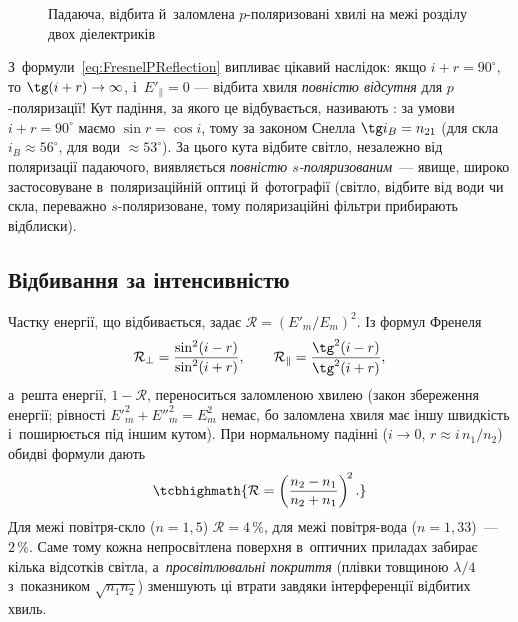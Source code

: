 \begin{figure}\centering
	\caption{Падаюча, відбита й~заломлена $p$-поляризовані хвилі на межі розділу двох
		діелектриків\label{pic:PPolarization}}
\end{figure}

\begin{Attention}[unbreakable]
	З~формули~\eqref{eq:FresnelPReflection} випливає цікавий наслідок: якщо $i+r=90^\circ$, то $\tg(i+r)\to\infty$, і~$E'_\parallel=0$ ---
	відбита хвиля \emph{повністю відсутня} для $p$-поляризації! Кут падіння, за якого це відбувається, називають : за умови $i+r=90^\circ$ маємо $\sin r=\cos i$, тому за законом Снелла $\tg i_B=n_{21}$ (для скла $i_B\approx56^\circ$, для води $\approx53^\circ$). За цього кута відбите світло, незалежно від поляризації падаючого, виявляється \emph{повністю $s$-поляризованим}~--- явище, широко застосовуване в~поляризаційній оптиці й~фотографії (світло, відбите від води чи скла, переважно $s$-поляризоване, тому поляризаційні фільтри прибирають відблиски).
\end{Attention}

\subsection*{Відбивання за інтенсивністю}

Частку енергії, що відбивається, задає  $\mathcal R=(E'_m/E_m)^2$. Із формул Френеля
\begin{equation*}
	\mathcal R_\perp=\frac{\sin^2(i-r)}{\sin^2(i+r)},\qquad \mathcal R_\parallel=\frac{\tg^2(i-r)}{\tg^2(i+r)},
\end{equation*}
а~решта енергії, $1-\mathcal R$, переноситься заломленою хвилею (закон збереження енергії; рівності $E'^2_m+E''^2_m=E_m^2$ немає, бо заломлена хвиля має іншу швидкість і~поширюється під іншим кутом). При нормальному падінні ($i\to0$, $r\approx i\,n_1/n_2$) обидві формули дають
\begin{equation}\label{eq:NormalReflectance}
	\tcbhighmath{
		\mathcal R=\left(\frac{n_2-n_1}{n_2+n_1}\right)^{\!2}.
	}
\end{equation}
Для межі повітря-скло ($n=1{,}5$) $\mathcal R=4\,\%$, для межі повітря-вода ($n=1{,}33$)~--- $2\,\%$. Саме тому кожна непросвітлена поверхня в~оптичних приладах забирає кілька відсотків світла, а~\emph{просвітлювальні покриття} (плівки товщиною $\lambda/4$ з~показником $\sqrt{n_1n_2}$) зменшують ці втрати завдяки інтерференції відбитих хвиль.


